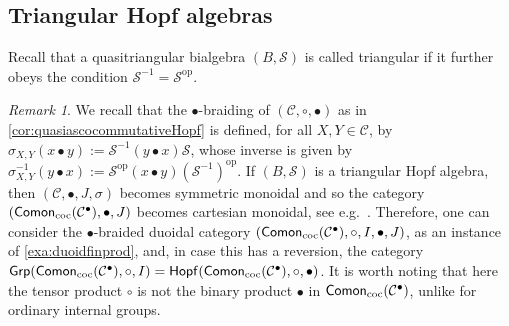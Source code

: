 \documentclass[nosumlimits,twoside]{amsart}
\theoremstyle{definition}
\theoremstyle{remark}
\newtheorem{remark}[remark]{\sc Remark}
\newcommand{\rd}[1]{{\color{red}{#1}}}
\newcommand{\as}[1]{{\color{blue}{#1}}}
\newcommand{\Cc}{\mathcal{C}}
\newcommand{\Ss}{\mathcal{S}}
\def\Grp{{\sf Grp}}
\def\Hopfmon{{\sf Hopf}}
\def\cComon{{\sf Comon}_{\mathrm{coc}}}
\begin{document}
\subsection{Triangular Hopf algebras}

Recall that a quasitriangular bialgebra $(B,\Ss)$ is called triangular if it further obeys the condition $\Ss^{-1}=\Ss^{\mathrm{op}}$.


\begin{remark}
\label{rmk:nntrvntgrps}
We recall that the $\bullet$-braiding of $(\Cc,\circ,\bullet)$ as in \cref{cor:quasiascocommutativeHopf} is defined, for all $X,Y\in\Cc$, by $\sigma_{X,Y}(x\bullet y):=\Ss^{-1}(y \bullet x)\Ss$, whose inverse is given by $\sigma_{X,Y}^{-1}(y\bullet x):=\Ss^{\mathrm{op}}(x\bullet y)(\Ss^{-1})^{\mathrm{op}}$. If $(B,\Ss)$ is a triangular Hopf algebra, then $(\Cc,\bullet,J,\sigma)$ becomes  symmetric monoidal and so the category $(\cComon(\Cc^\bullet),\bullet,J)$ becomes cartesian monoidal, see e.g.\ \cite[Corollary 2.24]{Ulrich-Myriam}. Therefore, one can consider the $\bullet$-braided duoidal category $(\cComon(\Cc^\bullet),\circ, I,\bullet,J)$, as an instance of \cref{exa:duoidfinprod}, and, in case this has a reversion, the category $\Grp(\cComon(\Cc^\bullet),\circ,I)=\Hopfmon(\cComon(\Cc^\bullet),\circ,\bullet)$. It is worth noting that here the tensor product $\circ$ is not the binary product $\bullet$ in $\cComon(\Cc^\bullet)$, unlike for ordinary internal groups.
\end{remark}
\end{document}
